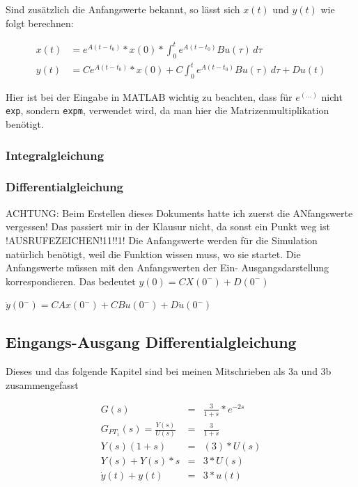 Sind zusätzlich die Anfangswerte bekannt, so lässt sich $x(t)$ und $y(t)$ wie folgt berechnen:

\begin{align*}
    x(t) & = e^{A(t-t_0)} * x(0) * \int_{0}^{t} e^{A(t-t_0)}Bu(\tau) \,d\tau \nonumber \\
    y(t) & = Ce^{A(t-t_0)} * x(0) + C \int_{0}^{t} e^{A(t-t_0)}Bu(\tau) \,d\tau + Du(t)
\end{align*}

Hier ist bei der Eingabe in MATLAB wichtig zu beachten, dass für $e^{(\ldots)}$ nicht \texttt{exp}, sondern \texttt{expm}, verwendet wird, da man hier die Matrizenmultiplikation benötigt.

\subsubsection{Integralgleichung}
\subsubsection{Differentialgleichung}

ACHTUNG: Beim Erstellen dieses Dokuments hatte ich zuerst die ANfangswerte vergessen! Das passiert mir in der Klausur nicht, da sonst ein Punkt weg ist !AUSRUFEZEICHEN!11!!1!
Die Anfangswerte werden für die Simulation natürlich benötigt, weil die Funktion wissen muss, wo sie startet.
Die Anfangswerte müssen mit den Anfangswerten der Ein-  Ausgangsdarstellung korrespondieren. 
Das bedeutet $y(0) = CX(0^-) + D(0^-)$

$ \dot y(0^-) = CAx(0^-) + CBu(0^-) + D \dot u (0^-)$

\subsection{Eingangs-Ausgang Differentialgleichung}

Dieses und das folgende Kapitel sind bei meinen Mitschrieben als 3a und 3b zusammengefasst

\begin{eqnarray*}
    G(s) &=& \frac{3}{1 + s} * e^{-2s}\\
    G_{PT_1}(s) =\frac{Y(s)}{U(s)} &=& \frac{3}{1 + s} \\
    Y(s)(1+s) &=& (3) * U(s) \\
    Y(s) + Y(s) *s &=& 3*U(s) \\
    \dot y(t) + y(t) &=& 3 * u(t) 
\end{eqnarray*}

